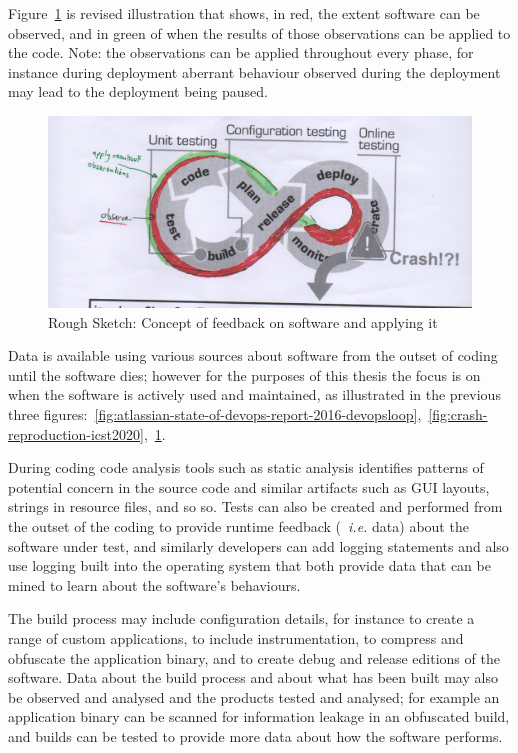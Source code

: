 Figure~\ref{fig:oberve-and-apply-devops-loop} is revised illustration that shows, in red, the extent software can be observed, and in green of when the results of those observations can be applied to the code. Note: the observations can be applied throughout every phase, for instance during deployment aberrant behaviour observed during the deployment may lead to the deployment being paused.

\begin{figure}[htbp!]
    \centering
    \includegraphics[width=14cm]{images/rough-sketches/hack-of-devops-crash-figure.png}
    \caption{Rough Sketch: Concept of feedback on software and applying it}
    \label{fig:oberve-and-apply-devops-loop}
\end{figure}

Data is available using various sources about software from the outset of coding until the software dies; however for the purposes of this thesis the focus is on when the software is actively used and maintained, as illustrated in the previous three figures:~\ref{fig:atlassian-state-of-devops-report-2016-devopsloop},~\ref{fig:crash-reproduction-icst2020},~\ref{fig:oberve-and-apply-devops-loop}. 

During coding code analysis tools such as static analysis identifies patterns of potential concern in the source code and similar artifacts such as GUI layouts, strings in resource files, and so so. Tests can also be created and performed from the outset of the coding to provide runtime feedback (~\emph{i.e.} data) about the software under test, and similarly developers can add logging statements and also use logging built into the operating system that both provide data that can be mined to learn about the software's behaviours.

The build process may include configuration details, for instance to create a range of custom applications, to include instrumentation, to compress and obfuscate the application binary, and to create debug and release editions of the software. Data about the build process and about what has been built may also be observed and analysed and the products tested and analysed; for example an application binary can be scanned for information leakage in an obfuscated build, and builds can be tested to provide more data about how the software performs.

